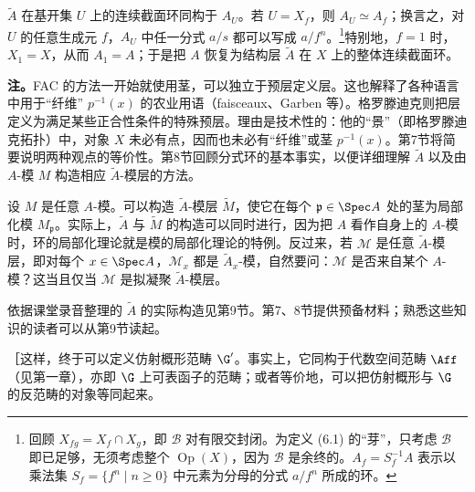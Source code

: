 $\widetilde A$ 在基开集 $U$ 上的连续截面环同构于 $A_U$。若 $U=X_f$，则 $A_U\simeq A_f$；换言之，对 $U$ 的任意生成元 $f$，$A_U$ 中任一分式 $a/s$ 都可以写成 $a/f^n$。\footnote{回顾 $X_{fg}=X_f\cap X_g$，即 $\mathcal B$ 对有限交封闭。为定义 (6.1) 的“芽”，只考虑 $\mathcal B$ 即已足够，无须考虑整个 $\operatorname{Op}(X)$，因为 $\mathcal B$ 是余终的。$A_f=S_f^{-1}A$ 表示以乘法集 $S_f=\{f^n\mid n\geq0\}$ 中元素为分母的分式 $a/f^n$ 所成的环。}特别地，$f=1$ 时，$X_1=X$，从而 $A_1=A$；于是把 $A$ 恢复为结构层 $\widetilde A$ 在 $X$ 上的整体连续截面环。

\textbf{注。}FAC 的方法一开始就使用茎，可以独立于预层定义层。这也解释了各种语言中用于“纤维” $p^{-1}(x)$ 的农业用语（faisceaux、Garben 等）。格罗滕迪克则把层定义为满足某些正合性条件的特殊预层。理由是技术性的：他的“景”（即格罗滕迪克拓扑）中，对象 $X$ 未必有点，因而也未必有“纤维”或茎 $p^{-1}(x)$。第7节将简要说明两种观点的等价性。第8节回顾分式环的基本事实，以便详细理解 $\widetilde A$ 以及由 $A$-模 $M$ 构造相应 $\widetilde A$-模层的方法。
\begin{center}
\end{center}

设 $M$ 是任意 $A$-模。可以构造 $\widetilde A$-模层 $\widetilde M$，使它在每个 $\mathfrak p\in\Spec A$ 处的茎为局部化模 $M_{\mathfrak p}$。实际上，$\widetilde A$ 与 $\widetilde M$ 的构造可以同时进行，因为把 $A$ 看作自身上的 $A$-模时，环的局部化理论就是模的局部化理论的特例。反过来，若 $\mathcal M$ 是任意 $\widetilde A$-模层，即对每个 $x\in\Spec A$，$\mathcal M_x$ 都是 $\widetilde A_x$-模，自然要问：$\mathcal M$ 是否来自某个 $A$-模？这当且仅当 $\mathcal M$ 是拟凝聚 $\widetilde A$-模层。

依据课堂录音整理的 $\widetilde A$ 的实际构造见第9节。第7、8节提供预备材料；熟悉这些知识的读者可以从第9节读起。

［这样，终于可以定义仿射概形范畴 $\G'$。事实上，它同构于代数空间范畴 $\Aff$（见第一章），亦即 $\G$ 上可表函子的范畴；或者等价地，可以把仿射概形与 $\G$ 的反范畴的对象等同起来。

